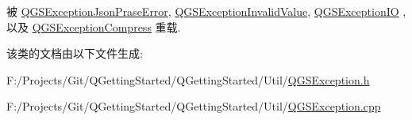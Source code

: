 被 \mbox{\hyperlink{class_q_g_s_exception_json_prase_error_a6e166d735947b6e55378ad4d11ad1ea3}{Q\+G\+S\+Exception\+Json\+Prase\+Error}}, \mbox{\hyperlink{class_q_g_s_exception_invalid_value_a6402f58552df25dca05ce46c10d17eef}{Q\+G\+S\+Exception\+Invalid\+Value}}, \mbox{\hyperlink{class_q_g_s_exception_i_o_a8b20d2161d01b33d97c2713c34a3cf4d}{Q\+G\+S\+Exception\+IO}} , 以及 \mbox{\hyperlink{class_q_g_s_exception_compress_a34cba6f06ac2a2f5ca80bb2732e6e33f}{Q\+G\+S\+Exception\+Compress}} 重载.



该类的文档由以下文件生成\+:\begin{DoxyCompactItemize}
\item 
F\+:/\+Projects/\+Git/\+Q\+Getting\+Started/\+Q\+Getting\+Started/\+Util/\mbox{\hyperlink{_q_g_s_exception_8h}{Q\+G\+S\+Exception.\+h}}\item 
F\+:/\+Projects/\+Git/\+Q\+Getting\+Started/\+Q\+Getting\+Started/\+Util/\mbox{\hyperlink{_q_g_s_exception_8cpp}{Q\+G\+S\+Exception.\+cpp}}\end{DoxyCompactItemize}

